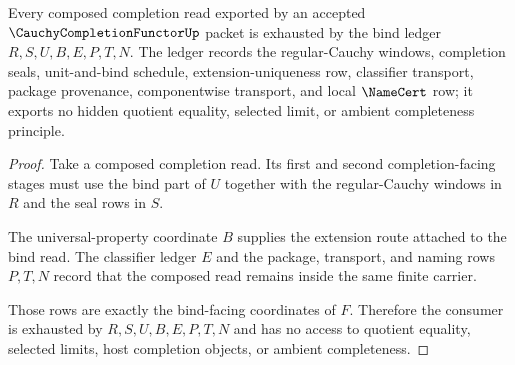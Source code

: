 \begin{theorem}
\label{thm:cauchycompletionfunctor-bind-ledger-consumer-exhaustion}
Every composed completion read exported by an accepted $\CauchyCompletionFunctorUp$ packet is exhausted by the bind ledger $R,S,U,B,E,P,T,N$. The ledger records the regular-Cauchy windows, completion seals, unit-and-bind schedule, extension-uniqueness row, classifier transport, package provenance, componentwise transport, and local $\NameCert$ row; it exports no hidden quotient equality, selected limit, or ambient completeness principle.
\end{theorem}
\begin{proof}
Take a composed completion read. Its first and second completion-facing stages must use the bind part of $U$ together with the regular-Cauchy windows in $R$ and the seal rows in $S$.

The universal-property coordinate $B$ supplies the extension route attached to the bind read. The classifier ledger $E$ and the package, transport, and naming rows $P,T,N$ record that the composed read remains inside the same finite carrier.

Those rows are exactly the bind-facing coordinates of $F$. Therefore the consumer is exhausted by $R,S,U,B,E,P,T,N$ and has no access to quotient equality, selected limits, host completion objects, or ambient completeness.
\end{proof}

